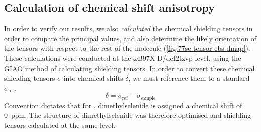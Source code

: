 \begin{refsection}
\subsection{Calculation of chemical shift anisotropy}
In order to verify our results, we also \emph{calculated} the chemical shielding tensors in order to compare the principal values, and also determine the likely orientation of the tensors with respect to the rest of the molecule (\cref{fig:77se-tensor-ebs-dmap}).
These calculations were conducted at the $\omega$B97X-D/def2tzvp level, using the GIAO method of calculating shielding tensors.\autocite{Schreckenbach1995CalculationTheory,Schreckenbach1996TheApproximation}
In order to convert these chemical shielding tensors $\sigma$ into chemical shifts $\delta$, we must reference them to a standard $\sigma_{\textrm{ref}}$.
\begin{equation}
  \delta = \sigma_{\textrm{ref}} - \sigma_{\textrm{sample}}
  \label{eqn:shieldingtoshift}
\end{equation}
Convention dictates that for , dimethylselenide is assigned a chemical shift of 0~ppm.
The structure of dimethylselenide was therefore optimised and shielding tensors calculated at the same level.


\end{refsection}
